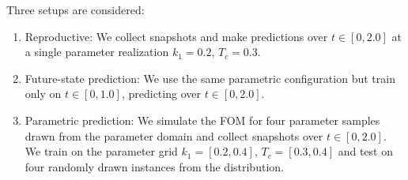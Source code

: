 \documentclass[3p,computermodern,11pt]{elsarticle}
\numberwithin{equation}{section}
\begin{document}
Three setups are considered:
\begin{enumerate}
\item Reproductive: We collect snapshots and make predictions over $t \in [0,2.0]$ at a  single parameter realization $k_1 = 0.2$, $T_c = 0.3$.
\item Future-state prediction: We use the same parametric configuration but train only on $t \in [0,1.0]$, predicting over $t \in [0,2.0]$.
\item Parametric prediction: We simulate the FOM for four parameter samples drawn from the parameter domain and collect snapshots over $t \in [0,2.0]$. We train on the parameter grid $k_1 = [0.2,0.4]$, $T_c = [0.3,0.4]$ and test on four randomly drawn instances from the distribution.
\end{enumerate} 
\end{document}
